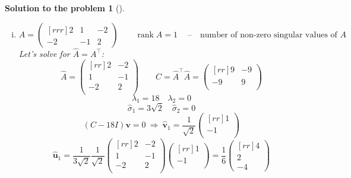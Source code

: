 \documentclass[12pt,a4]{article}
\newtheorem{solution}{Solution to the problem}
\newcommand\rank{\operatorname{rank}}
\newcommand{\bu}{{\mathbf u}}
\newcommand{\bv}{{\mathbf v}}
\newcommand{\answer}[1]{\textbf{Answer:} #1}
\begin{document}
\begin{solution}[]
\begin{enumerate}[(a)]
\begin{enumerate}[(i)]
\[ \qquad \bu_1 = \frac{A\bv_1}{\sigma_1} = \frac1{\sqrt5} \begin{pmatrix}[c] ~0~ \\ 1 \\ 2 \end{pmatrix}
\]
\answer{$
A = \sqrt5 \cdot \begin{pmatrix}[c] ~0~ \\ 1/\sqrt5 \\ 2/\sqrt5 \end{pmatrix} \cdot \begin{pmatrix}[r] 1 \end{pmatrix}
$}
	\item
\[
A =
\begin{pmatrix}[rrr]
2 & 1 & -2 \\
-2 & -1 & 2
\end{pmatrix}
\qquad
\rank A = 1 ~\text{ ~ -- ~ number of non-zero singular values of $A$}
\]
Let's solve for $\hat A = A^\top$:
\[
\hat A =
\begin{pmatrix}[rr]
2 & -2\\
1 & -1\\
-2 & 2\\
\end{pmatrix}
\qquad
C = \hat A^\top \hat A = 
\begin{pmatrix}[rr]
9 & -9\\
-9 & 9\\
\end{pmatrix}
\]
\[
\lambda_1 = 18 \quad \lambda_2 = 0
\]
\[
\hat \sigma_1 = 3 \sqrt2 \quad \hat \sigma_2 = 0
\]
\[
(C - 18I)\bv = 0 ~\Rightarrow ~
\hat \bv_1 =
\frac1{\sqrt2}
\begin{pmatrix}[rr] 1 \\ -1 \\ \end{pmatrix}
\]
\[
\hat \bu_1 = \frac{1}{3 \sqrt2}
\frac1{\sqrt2}
\begin{pmatrix}[rr]
2 & -2\\
1 & -1\\
-2 & 2\\
\end{pmatrix}
\begin{pmatrix}[rr] 1 \\ -1 \\ \end{pmatrix}
=
\frac{1}{6}
\begin{pmatrix}[rr]
4 \\ 2 \\ -4
\end{pmatrix}
\]
\end{enumerate}
\end{enumerate}
\end{solution}
\end{document}
